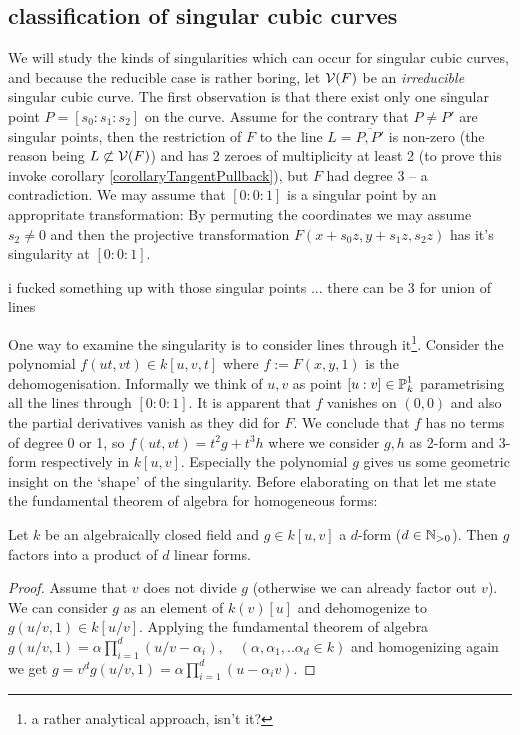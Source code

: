 \subsection{classification of singular cubic curves}

We will study the kinds of singularities which can occur for singular cubic curves, and because the reducible case is rather boring,
let $\operatorname{\mathcal V}(F)$ be an \emph{irreducible} singular cubic curve.
The first observation is that there exist only one singular point $P = [s_0:s_1:s_2]$ on the curve.
Assume for the contrary that $P \neq P'$ are singular points, then the restriction of $F$ to the line $L = \overline{P,P'}$ is non-zero (the reason being $L \not\subset \operatorname{\mathcal V}(F)$) and has 2 zeroes of multiplicity at least 2 (to prove this invoke corollary \ref{corollaryTangentPullback}), but $F$ had degree 3 -- a contradiction.
We may assume that $[0:0:1]$ is a singular point by an appropritate transformation:
By permuting the coordinates we may assume $s_2 \neq 0$ and then the projective transformation $F(x+s_0z,y+s_1z,s_2z)$ has it's singularity at $[0:0:1]$.
\begin{todo}
\item i fucked something up with those singular points ... there can be 3 for union of lines
\end{todo}

One way to examine the singularity is to consider lines through it\footnote{a rather analytical approach, isn't it?}.
Consider the polynomial $f(ut, vt) \in k[u,v,t]$ where $f := F(x,y,1)$ is the dehomogenisation.
Informally we think of $u,v$ as point $[u:v] \in \operatorname{\mathbb P}^1_k$ parametrising all the lines through $[0:0:1]$.
It is apparent that $f$ vanishes on $(0,0)$ and also the partial derivatives vanish as they did for $F$.
We conclude that $f$ has no terms of degree 0 or 1, so $f(ut,vt) = t^2g + t^3h$ where we consider $g,h$ as 2-form and 3-form respectively in $k[u,v]$.
Especially the polynomial $g$ gives us some geometric insight on the `shape' of the singularity.
Before elaborating on that let me state the fundamental theorem of algebra for homogeneous forms:

\begin{lemma} \label{lemmaFundamentalTheorem}
Let $k$ be an algebraically closed field and $g \in k[u,v]$ a $d$-form ($d \in \operatorname{\mathbb N_{>0}}$).
Then $g$ factors into a product of $d$ linear forms.
\end{lemma}
\begin{proof}
Assume that $v$ does not divide $g$ (otherwise we can already factor out $v$).
We can consider $g$ as an element of $k(v)[u]$ and dehomogenize to $g(u/v,1) \in k[u/v]$.
Applying the fundamental theorem of algebra $g(u/v,1) = \alpha\prod_{i=1}^d(u/v - \alpha_i), \quad (\alpha,\alpha_1,..\alpha_d \in k)$ and homogenizing again we get
$g = v^d g(u/v,1) = \alpha\prod_{i=1}^d(u - \alpha_iv)$.
\end{proof}

